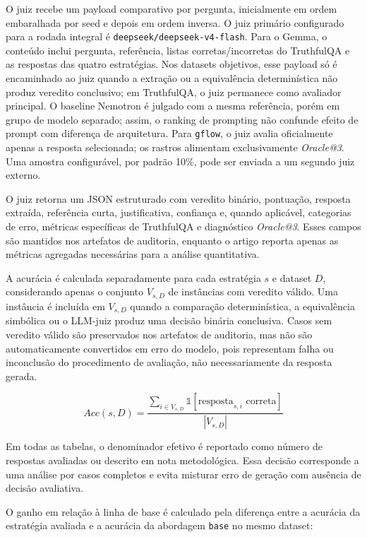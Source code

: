 \documentclass[12pt]{article}
\makeatletter
\newcommand{\oracle}{\mbox{\textit{Oracle@3}}}
\makeatother
\begin{document}
O juiz recebe um payload comparativo por pergunta, inicialmente em ordem embaralhada por seed e depois em ordem inversa. O juiz primário configurado para a rodada integral é \texttt{deepseek/deepseek-v4-flash}. Para o Gemma, o conteúdo inclui pergunta, referência, listas corretas/incorretas do TruthfulQA e as respostas das quatro estratégias. Nos datasets objetivos, esse payload só é encaminhado ao juiz quando a extração ou a equivalência determinística não produz veredito conclusivo; em TruthfulQA, o juiz permanece como avaliador principal. O baseline Nemotron é julgado com a mesma referência, porém em grupo de modelo separado; assim, o ranking de prompting não confunde efeito de prompt com diferença de arquitetura. Para \texttt{gflow}, o juiz avalia oficialmente apenas a resposta selecionada; os rastros alimentam exclusivamente \oracle{}. Uma amostra configurável, por padrão 10\%, pode ser enviada a um segundo juiz externo.

O juiz retorna um JSON estruturado com veredito bin\'ario, pontua\c{c}\~ao, resposta extra\'ida, refer\^encia curta, justificativa, confian\c{c}a e, quando aplic\'avel, categorias de erro, m\'etricas espec\'ificas de TruthfulQA e diagn\'ostico \oracle{}. Esses campos s\~ao mantidos nos artefatos de auditoria, enquanto o artigo reporta apenas as m\'etricas agregadas necess\'arias para a an\'alise quantitativa.

A acurácia é calculada separadamente para cada estratégia \(s\) e dataset \(D\), considerando apenas o conjunto \(V_{s,D}\) de instâncias com veredito válido. Uma instância é incluída em \(V_{s,D}\) quando a comparação determinística, a equivalência simbólica ou o LLM-juiz produz uma decisão binária conclusiva. Casos sem veredito válido são preservados nos artefatos de auditoria, mas não são automaticamente convertidos em erro do modelo, pois representam falha ou inconclusão do procedimento de avaliação, não necessariamente da resposta gerada.

\begin{equation}
Acc(s,D)=
\frac{\sum_{i \in V_{s,D}} \mathbb{1}[\text{resposta}_{s,i}\text{ correta}]}
{|V_{s,D}|}
\end{equation}

Em todas as tabelas, o denominador efetivo é reportado como número de respostas avaliadas ou descrito em nota metodológica. Essa decisão corresponde a uma análise por casos completos e evita misturar erro de geração com ausência de decisão avaliativa.

O ganho em relação à linha de base é calculado pela diferença entre a acurácia da estratégia avaliada e a acurácia da abordagem \texttt{base} no mesmo dataset:
\end{document}
